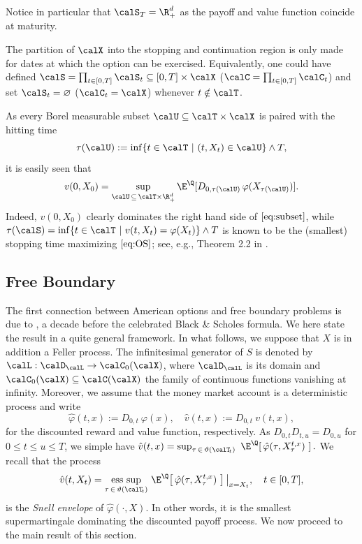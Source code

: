 Notice in particular that $\calS_T=\R^d_+$ as the payoff and value function coincide at maturity.
\begin{remark}
The partition of $\calX$ into the stopping and continuation region is only made for dates at which the option can be exercised. Equivalently, one could have defined 
$\calS = \prod_{t\in [0,T]} \calS_t \subseteq [0,T]\times \calX$ ($\calC = \prod_{t\in [0,T]} \calC_t$) and set $\calS_t =\varnothing$ ($\calC_t =\calX$) whenever $t\notin \calT$. 
\end{remark}
As every Borel measurable subset $\calU \subseteq \calT \times \calX$ is paired with the hitting time $$\tau(\calU) := \inf\{t\in \calT \ | \ (t,X_t) \in \calU \}\wedge T,$$
it is easily seen that
\begin{equation}\label{eq:subset}
   v(0,X_0) =\underset{\calU \, \subseteq \, \calT \times \R^d_+}{\text{sup}} \, \E^{\Q}[D_{0,\tau(\calU)}\, \varphi(X_{\tau(\calU)})].  
\end{equation}
Indeed, $v(0,X_0)$ clearly dominates the right hand side of $\eqref{eq:subset}$, while  $\tau(\calS)= \inf\{t\in \calT \ | \ v(t,X_t)= \varphi(X_t) \} \wedge T$ is known to be the (smallest)   stopping time maximizing $\eqref{eq:OS}$; see, e.g., Theorem 2.2 in  \citet{PeskirShiryaev}. 

\subsection{Free Boundary}

The first connection between American options and free boundary problems is due to
\citet{mcKean}, a decade before the celebrated Black \& Scholes formula. We here state the result in a quite general framework. In what follows, we suppose that $X$ is in addition a Feller process. The infinitesimal generator of $S$ is denoted by $\calL: \calD_{\calL} \to \calC_0(\calX)$, where $\calD_{\calL}$ is its domain and $\calC_0(\calX) \subseteq \calC(\calX)$ the family of  continuous functions  vanishing at infinity.  
Moreover, we assume that the money market account is a deterministic process and write $$\hat{\varphi}(t,x):= D_{0,t}\ \varphi(x), \quad \hat{v}(t,x):= D_{0,t} \ v(t,x),$$
for the discounted reward and value function, respectively. As $D_{0,t}D_{t,u}=D_{0,u}$ for $0\le t \le u \le  T$, we simple have   $\hat{v}(t,x)= \sup_{\tau \, \in\,  \vartheta(\calT_{\!t})} \ \E^{\Q}\! \left[ \,  \hat{\varphi}(\tau, X^{t,x}_\tau)\ \right].$ We recall that the process 
$$\hat{v}(t,X_t)= \underset{\tau \, \in\,  \vartheta(\calT_{\!t})}{\text{ess sup}} \ \E^{\Q}\! \left[ \,  \hat{\varphi}(\tau, X^{t,x}_\tau)\ \right]\big |_{x=X_t}, \quad t \in [0,T],$$
is the \textit{Snell envelope} of $\hat{\varphi}(\cdot,X)$. %
In other words, it is the smallest supermartingale dominating the discounted payoff process. We  now proceed to the main result of this section.  

